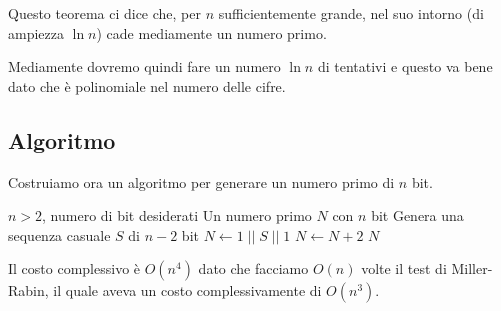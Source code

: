 Questo teorema ci dice che, per $n$ sufficientemente grande, nel suo intorno (di ampiezza $\ln n$) cade mediamente un
numero primo.

Mediamente dovremo quindi fare un numero $\ln n$ di tentativi e questo va bene dato che \`e polinomiale nel numero
delle cifre.

\newpage
\subsection{Algoritmo}

Costruiamo ora un algoritmo per generare un numero primo di $n$ bit.

\begin{algorithm} \caption{Generazione di un numero primo a $n$ bit}
	\begin{algorithmic}[1]
	\Require $n > 2$, numero di bit desiderati
	\Ensure Un numero primo $N$ con $n$ bit
	\State Genera una sequenza casuale $S$ di $n-2$ bit
	\State $N \gets 1 \;||\; S \;||\; 1$ 
		\State $N \gets N + 2$
	\EndWhile
	\State \Return $N$
	\end{algorithmic}
\end{algorithm}

Il costo complessivo \`e $O(n^4)$ dato che facciamo $O(n)$ volte il test di Miller-Rabin, il quale aveva un costo
complessivamente di $O(n^3)$.
